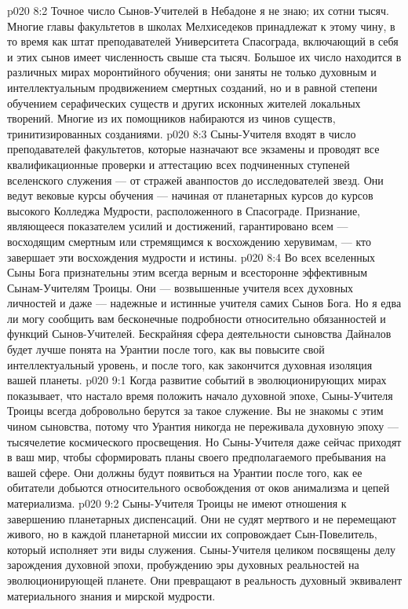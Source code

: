 \vs p020 8:2 Точное число Сынов\hyp{}Учителей в Небадоне я не знаю; их сотни тысяч. Многие главы факультетов в школах Мелхиседеков принадлежат к этому чину, в то время как штат преподавателей Университета Спасограда, включающий в себя и этих сынов имеет численность свыше ста тысяч. Большое их число находится в различных мирах моронтийного обучения; они заняты не только духовным и интеллектуальным продвижением смертных созданий, но и в равной степени обучением серафических существ и других исконных жителей локальных творений. Многие из их помощников набираются из чинов существ, тринитизированных созданиями.
\vs p020 8:3 Сыны\hyp{}Учителя входят в число преподавателей факультетов, которые назначают все экзамены и проводят все квалификационные проверки и аттестацию всех подчиненных ступеней вселенского служения --- от стражей аванпостов до исследователей звезд. Они ведут вековые курсы обучения --- начиная от планетарных курсов до курсов высокого Колледжа Мудрости, расположенного в Спасограде. Признание, являющееся показателем усилий и достижений, гарантировано всем --- восходящим смертным или стремящимся к восхождению херувимам, --- кто завершает эти восхождения мудрости и истины.
\vs p020 8:4 Во всех вселенных Сыны Бога признательны этим всегда верным и всесторонне эффективным Сынам\hyp{}Учителям Троицы. Они --- возвышенные учителя всех духовных личностей и даже --- надежные и истинные учителя самих Сынов Бога. Но я едва ли могу сообщить вам бесконечные подробности относительно обязанностей и функций Сынов\hyp{}Учителей. Бескрайняя сфера деятельности сыновства Дайналов будет лучше понята на Урантии после того, как вы повысите свой интеллектуальный уровень, и после того, как закончится духовная изоляция вашей планеты.
\vs p020 9:1 Когда развитие событий в эволюционирующих мирах показывает, что настало время положить начало духовной эпохе, Сыны\hyp{}Учителя Троицы всегда добровольно берутся за такое служение. Вы не знакомы с этим чином сыновства, потому что Урантия никогда не переживала духовную эпоху --- тысячелетие космического просвещения. Но Сыны\hyp{}Учителя даже сейчас приходят в ваш мир, чтобы сформировать планы своего предполагаемого пребывания на вашей сфере. Они должны будут появиться на Урантии после того, как ее обитатели добьются относительного освобождения от оков анимализма и цепей материализма.
\vs p020 9:2 Сыны\hyp{}Учителя Троицы не имеют отношения к завершению планетарных диспенсаций. Они не судят мертвого и не перемещают живого, но в каждой планетарной миссии их сопровождает Сын\hyp{}Повелитель, который исполняет эти виды служения. Сыны\hyp{}Учителя целиком посвящены делу зарождения духовной эпохи, пробуждению эры духовных реальностей на эволюционирующей планете. Они превращают в реальность духовный эквивалент материального знания и мирской мудрости.
